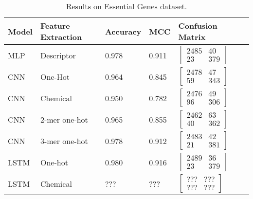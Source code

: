 \begin{longtable}{llllll}
	\caption{Results on Essential Genes dataset.}
	\label{tab:eg_results}
    \endfirsthead
    \endhead
    
	\textbf{Model} & \textbf{Feature Extraction} & \textbf{Accuracy}  & \textbf{MCC} & \textbf{Confusion Matrix}\\\midrule
	
	MLP & Descriptor & 0.978 & 0.911 & 
	$\begin{bmatrix}
        2485 & 40\\ 
        23 & 379
    \end{bmatrix}$
    \\\midrule


    CNN & One-Hot & 0.964 & 0.845 &
	$\begin{bmatrix}
        2478 & 47\\ 
        59 & 343
    \end{bmatrix}$
    \\

    CNN & Chemical & 0.950 & 0.782 &
	$\begin{bmatrix}
        2476 & 49\\ 
        96 & 306
    \end{bmatrix}$
    \\

    CNN & 2-mer one-hot & 0.965 & 0.855 & 
	$\begin{bmatrix}
        2462 & 63\\ 
        40 & 362
    \end{bmatrix}$
    \\

    CNN & 3-mer one-hot & 0.978 & 0.912 & 
	$\begin{bmatrix}
        2483 & 42\\ 
        21 & 381
    \end{bmatrix}$
    \\\midrule


    LSTM & One-hot & 0.980 & 0.916 & 
	$\begin{bmatrix}
        2489 & 36\\ 
        23 & 379
    \end{bmatrix}$
    \\

    LSTM & Chemical & ??? & ??? & 
	$\begin{bmatrix}
        ??? & ???\\ 
        ??? & ???
    \end{bmatrix}$
    \\


\end{longtable}
